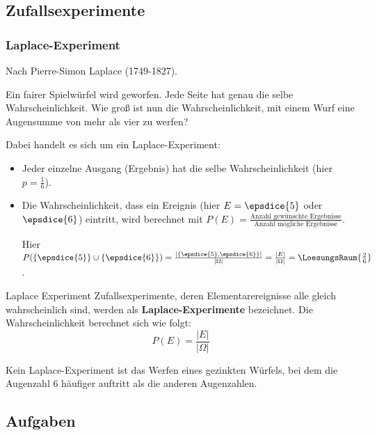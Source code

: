 
\subsection{Zufallsexperimente}

\subsubsection{Laplace-Experiment}
Nach Pierre-Simon Laplace (1749-1827).

Ein fairer Spielwürfel wird geworfen. Jede Seite hat genau die selbe
Wahrscheinlichkeit. Wie groß ist nun die Wahrscheinlichkeit, mit einem
Wurf eine Augensumme von mehr als vier zu werfen?


Dabei handelt es sich um ein Laplace-Experiment:
\begin{itemize}
\item Jeder einzelne Ausgang (Ergebnis) hat die selbe Wahrscheinlichkeit
      (hier $p = \frac{1}{6}$).
\item Die Wahrscheinlichkeit, dass ein Ereignis (hier $E = \epsdice{5}$
oder $\epsdice{6}$) eintritt, wird berechnet mit $P(E)
= \frac{\textrm{Anzahl gewünschte Ergebnisse}}{\textrm{Anzahl
mögliche Ergebnisse}}$.

Hier $P(\{\epsdice{5}\}\cup\{\epsdice{6}\}) = \frac{\left|\left\{\epsdice{5}, \epsdice{6}\right\}\right|}{|\Omega|}= \frac{|E|}{|\Omega|}=\LoesungsRaum{\frac{2}{6}}$.
\end{itemize}

\begin{definition}{Laplace Experiment}{}
  Zufallsexperimente, deren Elementarereignisse alle gleich wahrscheinlich sind, werden als
  \textbf{Laplace-Experimente} bezeichnet. Die Wahrscheinlichkeit berechnet sich wie folgt:
  $$P(E) = \frac{|E|}{|\Omega|}$$
\end{definition}


Kein Laplace-Experiment ist \zB das Werfen eines gezinkten Würfels,
bei dem die Augenzahl 6 häufiger auftritt als die anderen Augenzahlen.

\subsection*{Aufgaben}

